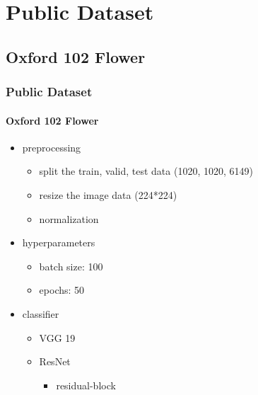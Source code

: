 \documentclass[
	11pt, %
	aspectratio=169, %
]{beamer}
\begin{document}
\section{Public Dataset}
\subsection{Oxford 102 Flower}

\begin{frame}
	\frametitle{Public Dataset}
	\framesubtitle{Oxford 102 Flower}

	\begin{itemize}
		\item preprocessing
		\begin{itemize}
			\item split the train, valid, test data (1020, 1020, 6149)
			\item resize the image data (224*224)
			\item normalization
		\end{itemize}
		\item hyperparameters
		\begin{itemize}
			\item batch size: 100
			\item epochs: 50
		\end{itemize}
		\item classifier
		\begin{itemize}
			\item VGG 19
			\item ResNet
			\begin{itemize}
				\item residual-block
			\end{itemize}
		\end{itemize}
	\end{itemize}
\end{frame}
\end{document}
